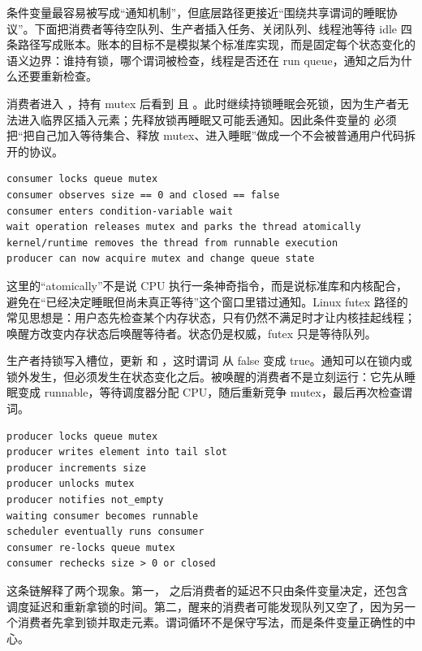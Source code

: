 条件变量最容易被写成“通知机制”，但底层路径更接近“围绕共享谓词的睡眠协议”。下面把消费者等待空队列、生产者插入任务、关闭队列、线程池等待 idle 四条路径写成账本。账本的目标不是模拟某个标准库实现，而是固定每个状态变化的语义边界：谁持有锁，哪个谓词被检查，线程是否还在 run queue，通知之后为什么还要重新检查。

消费者进入 ，持有 mutex 后看到  且 。此时继续持锁睡眠会死锁，因为生产者无法进入临界区插入元素；先释放锁再睡眠又可能丢通知。因此条件变量的  必须把“把自己加入等待集合、释放 mutex、进入睡眠”做成一个不会被普通用户代码拆开的协议。

\begin{lstlisting}[numbers=none,caption={消费者等待空队列的语义事件链}]
consumer locks queue mutex
consumer observes size == 0 and closed == false
consumer enters condition-variable wait
wait operation releases mutex and parks the thread atomically
kernel/runtime removes the thread from runnable execution
producer can now acquire mutex and change queue state
\end{lstlisting}

这里的“atomically”不是说 CPU 执行一条神奇指令，而是说标准库和内核配合，避免在“已经决定睡眠但尚未真正等待”这个窗口里错过通知。Linux futex 路径的常见思想是：用户态先检查某个内存状态，只有仍然不满足时才让内核挂起线程；唤醒方改变内存状态后唤醒等待者。状态仍是权威，futex 只是等待队列。

生产者持锁写入槽位，更新  和 ，这时谓词  从 false 变成 true。通知可以在锁内或锁外发生，但必须发生在状态变化之后。被唤醒的消费者不是立刻运行：它先从睡眠变成 runnable，等待调度器分配 CPU，随后重新竞争 mutex，最后再次检查谓词。

\begin{lstlisting}[numbers=none,caption={notify 到真正执行之间仍有调度路径}]
producer locks queue mutex
producer writes element into tail slot
producer increments size
producer unlocks mutex
producer notifies not_empty
waiting consumer becomes runnable
scheduler eventually runs consumer
consumer re-locks queue mutex
consumer rechecks size > 0 or closed
\end{lstlisting}

这条链解释了两个现象。第一， 之后消费者的延迟不只由条件变量决定，还包含调度延迟和重新拿锁的时间。第二，醒来的消费者可能发现队列又空了，因为另一个消费者先拿到锁并取走元素。谓词循环不是保守写法，而是条件变量正确性的中心。

